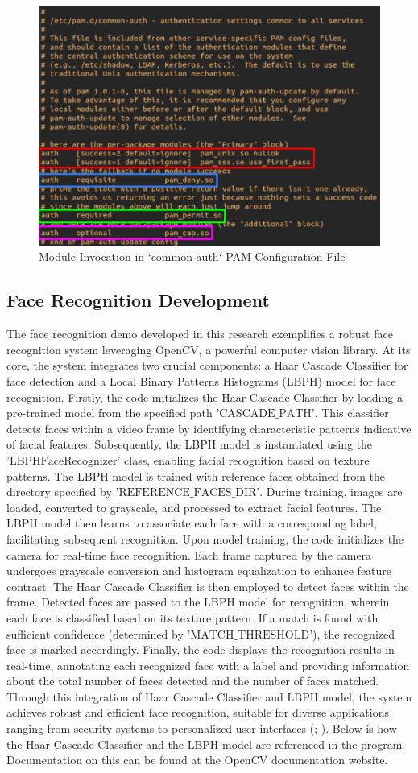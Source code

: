 \documentclass[
]{article}
\begin{document}
\begin{figure}[htbp]
  \centering
  \includegraphics[width=0.4\linewidth]{images/common-auth.png}
  \caption{Module Invocation in `common-auth` PAM Configuration File}
\end{figure}

\begin{multicols}{2}

\section{Face Recognition Development}
The face recognition demo developed in this research exemplifies a robust face recognition system leveraging OpenCV, a powerful computer vision library. At its core, the system integrates two crucial components: a Haar Cascade Classifier for face detection and a Local Binary Patterns Histograms (LBPH) model for face recognition. Firstly, the code initializes the Haar Cascade Classifier by loading a pre-trained model from the specified path \( \text{'CASCADE\_PATH'} \). This classifier detects faces within a video frame by identifying characteristic patterns indicative of facial features. Subsequently, the LBPH model is instantiated using the \( \text{'LBPHFaceRecognizer'} \) class, enabling facial recognition based on texture patterns. The LBPH model is trained with reference faces obtained from the directory specified by \( \text{'REFERENCE\_FACES\_DIR'} \). During training, images are loaded, converted to grayscale, and processed to extract facial features. The LBPH model then learns to associate each face with a corresponding label, facilitating subsequent recognition. Upon model training, the code initializes the camera for real-time face recognition. Each frame captured by the camera undergoes grayscale conversion and histogram equalization to enhance feature contrast. The Haar Cascade Classifier is then employed to detect faces within the frame. Detected faces are passed to the LBPH model for recognition, wherein each face is classified based on its texture pattern. If a match is found with sufficient confidence (determined by \( \text{'MATCH\_THRESHOLD'} \)), the recognized face is marked accordingly. Finally, the code displays the recognition results in real-time, annotating each recognized face with a label and providing information about the total number of faces detected and the number of faces matched. Through this integration of Haar Cascade Classifier and LBPH model, the system achieves robust and efficient face recognition, suitable for diverse applications ranging from security systems to personalized user interfaces (\cite{deng2010}; \cite{ahonen2004}). Below is how the Haar Cascade Classifier and the LBPH model are referenced in the program. Documentation on this can be found at the OpenCV documentation website.



\end{multicols}
\end{document}
